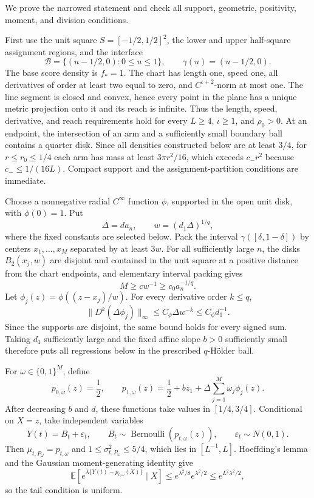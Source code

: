 We prove the narrowed statement and check all support, geometric, positivity, moment, and division conditions.

First use the unit square \(S=[-1/2,1/2]^2\), the lower and upper half-square assignment regions, and the interface
\[
\mathcal B=\{(u-1/2,0):0\leq u\leq1\},
\qquad \gamma(u)=(u-1/2,0).
\]
The base score density is \(f_*=1\).  The chart has length one, speed one, all derivatives of order at least two equal to zero, and \(C^{\iota+2}\)-norm at most one.  The line segment is closed and convex, hence every point in the plane has a unique metric projection onto it and its reach is infinite.  Thus the length, speed, derivative, and reach requirements hold for every \(L\geq4\), \(\iota\geq1\), and \(\rho_0>0\).  At an endpoint, the intersection of an arm and a sufficiently small boundary ball contains a quarter disk.  Since all densities constructed below are at least \(3/4\), for \(r\leq r_0\leq1/4\) each arm has mass at least \(3\pi r^2/16\), which exceeds \(c_{-}r^2\) because \(c_{-}\leq1/(16L)\).  Compact support and the assignment-partition conditions are immediate.

Choose a nonnegative radial \(C^\infty\) function \(\phi\), supported in the open unit disk, with \(\phi(0)=1\).  Put
\[
\Delta=d a_n,
\qquad
w=(d_1\Delta)^{1/q},
\]
where the fixed constants are selected below.  Pack the interval \(\gamma([\delta,1-\delta])\) by centers \(x_1,\ldots,x_M\) separated by at least \(3w\).  For all sufficiently large \(n\), the disks \(B_2(x_j,w)\) are disjoint and contained in the unit square at a positive distance from the chart endpoints, and elementary interval packing gives
\[
M\geq c w^{-1}\geq c_0a_n^{-1/q}.
\]
Let \(\phi_j(z)=\phi((z-x_j)/w)\).  For every derivative order \(k\leq q\),
\[
\lVert D^k(\Delta\phi_j)\rVert_\infty
\leq C_\phi\Delta w^{-k}
\leq C_\phi d_1^{-1}.
\]
Since the supports are disjoint, the same bound holds for every signed sum.  Taking \(d_1\) sufficiently large and the fixed affine slope \(b>0\) sufficiently small therefore puts all regressions below in the prescribed \(q\)-H\"older ball.

For \(\omega\in\{0,1\}^M\), define
\[
p_{0,\omega}(z)=\frac12,
\qquad
p_{1,\omega}(z)=\frac12+bz_1+\Delta\sum_{j=1}^M\omega_j\phi_j(z).
\]
After decreasing \(b\) and \(d\), these functions take values in \([1/4,3/4]\).  Conditional on \(X=z\), take independent variables
\[
Y(t)=B_t+\varepsilon_t,
\qquad
B_t\sim\operatorname{Bernoulli}(p_{t,\omega}(z)),
\qquad
\varepsilon_t\sim N(0,1).
\]
Then \(\mu_{t,P_\omega}=p_{t,\omega}\) and
\(1\leq\sigma^2_{t,P_\omega}\leq5/4\), which lies in \([L^{-1},L]\).  Hoeffding's lemma and the Gaussian moment-generating identity give
\[
\mathbb E\!\left[e^{\lambda\{Y(t)-p_{t,\omega}(X)\}}\mid X\right]
\leq e^{\lambda^2/8}e^{\lambda^2/2}
\leq e^{L^2\lambda^2/2},
\]
so the tail condition is uniform.

